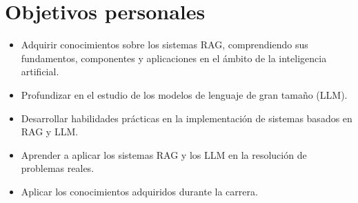\section{Objetivos personales}

\begin{itemize}
\tightlist
\item Adquirir conocimientos sobre los sistemas RAG, comprendiendo sus fundamentos, componentes y aplicaciones en el ámbito de la inteligencia artificial.
\item Profundizar en el estudio de los modelos de lenguaje de gran tamaño (LLM).
\item Desarrollar habilidades prácticas en la implementación de sistemas basados en RAG y LLM.
\item Aprender a aplicar los sistemas RAG y los LLM en la resolución de problemas reales.
\item Aplicar los conocimientos adquiridos durante la carrera.
\end{itemize}
